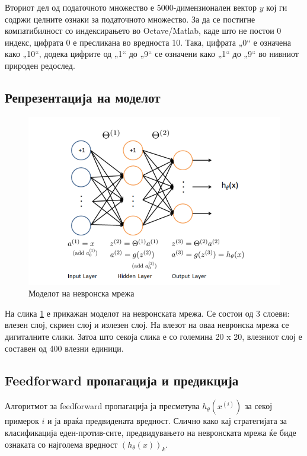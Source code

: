 Вториот дел од податочното множество е 5000-димензионален вектор $y$ кој 
ги содржи целните ознаки за податочното множество. За да се постигне
компатибилност со индексирањето во Octave/Matlab, каде што не постои 0 индекс,
цифрата 0 е пресликана во вредноста 10. Така, цифрата „0“ е означена како „10“,
додека цифрите од „1“ до „9“ се означени како „1“ до „9“ во нивниот природен
редослед.

\subsection{Репрезентација на моделот}

\begin{figure}[htb]
\centering
\includegraphics[width=.9\textwidth]{src/neuralNetwork2/neuralNetwork}
\caption{Моделот на невронска мрежа}
\label{fig:neuralNetwork}
\end{figure}

На слика \ref{fig:neuralNetwork} е прикажан моделот на невронската мрежа. Се
состои од 3 слоеви: влезен слој, скриен слој и излезен слој. На влезот на оваа
невронска мрежа се дигиталните слики. Затоа што секоја слика е со големина 20 x
20, влезниот слој е составен од 400 влезни единици.

\subsection{Feedforward пропагација и предикција}

Алгоритмот за feedforward пропагација ја пресметува $h_\theta(x^{(i)})$ за секој
примерок $i$ и ја враќа предвидената вредност. Слично како кај стратегијата за класификација
еден-против-сите, предвидувањето на невронската мрежа ќе биде ознаката со
најголема вредност $(h_\theta(x))_k$.

